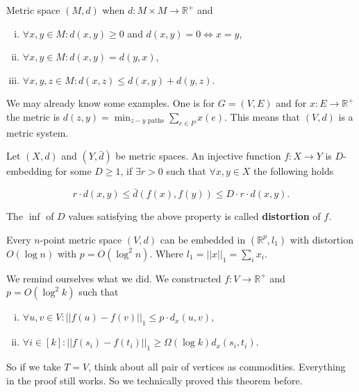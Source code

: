 \begin{defn}
	Metric space $(M,d)$ when $d : M \times M \to \mathbb{R}^{+}$ and
	
	\begin{enumerate}[(i)]
		\item $\forall x,y \in M: d(x,y) \geq 0$ and $d(x,y) = 0 \Leftrightarrow x = y$,
		\item $\forall x,y \in M : d(x,y) = d(y,x)$,
		\item $\forall x,y,z \in M: d(x,z) \leq d(x,y) + d(y,z)$.
	\end{enumerate}
\end{defn}

We may already know some examples. One is for $G = (V,E)$ and for $x : E \to \mathbb{R}^{+}$ the metric is $d(z,y) = \min_{z-y \text{ paths}} \sum_{e \in P} x(e)$. This means that $(V,d)$ is a metric system.

\begin{defn}
	Let $(X,d)$ and $\left(Y,\bar{d}\right)$ be metric spaces. An injective function $f : X \to Y$ is $D$-embedding for some $D \geq 1$, if $\exists r > 0$ such that $\forall x,y \in X$ the following holds
	
	$$
	r \cdot d(x,y) \leq \bar{d}(f(x), f(y)) \leq D \cdot r \cdot d(x,y).
	$$
\end{defn}

\begin{defn}
	The $\inf$ of $D$ values satisfying the above property is called \textbf{distortion} of $f$.
\end{defn}

\begin{thm}[Bourgain, 1985]
	Every $n$-point metric space $(V,d)$ can be embedded in $(\mathbb{R}^{p}, l_{1})$ with distortion $O(\log n)$ with $p = O(\log ^{2} n)$. Where $l_{1} = ||x||_{1} = \sum_{i}x_{i}$.
\end{thm}

We remind ourselves what we did. We constructed $f : V \to \mathbb{R}^{+}$ and $p = O(\log^{2} k)$ such that

\begin{enumerate}[(i)]
	\item $\forall u,v \in V : ||f(u) - f(v)||_{1} \leq p \cdot d_{x}(u,v)$,
	\item $\forall i \in [k] : ||f(s_{i}) - f(t_{i})||_{1} \geq \Omega(\log k) d_{x}(s_{i}, t_{i})$.
\end{enumerate}

So if we take $T = V$, think about all pair of vertices as commodities. Everything in the proof still works. So we technically proved this theorem before.

